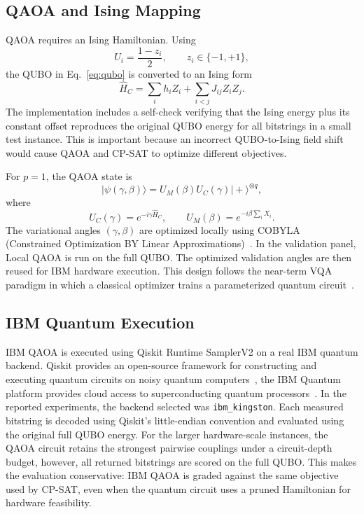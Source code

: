 \documentclass[runningheads]{llncs}
\begin{document}
\subsection{QAOA and Ising Mapping}

QAOA requires an Ising Hamiltonian. Using
\begin{equation}
U_i=\frac{1-z_i}{2},\qquad z_i\in\{-1,+1\},
\end{equation}
the QUBO in Eq.~\eqref{eq:qubo} is converted to an Ising form
\begin{equation}
\hat{H}_C=\sum_i h_iZ_i+\sum_{i<j}J_{ij}Z_iZ_j.
\end{equation}
The implementation includes a self-check verifying that the Ising energy plus its constant offset reproduces the original QUBO energy for all bitstrings in a small test instance. This is important because an incorrect QUBO-to-Ising field shift would cause QAOA and CP-SAT to optimize different objectives.

For $p=1$, the QAOA state is
\begin{equation}
|\psi(\gamma,\beta)\rangle =
U_M(\beta)U_C(\gamma)|+\rangle^{\otimes q},
\end{equation}
where
\begin{equation}
U_C(\gamma)=e^{-i\gamma \hat{H}_C}, \qquad
U_M(\beta)=e^{-i\beta\sum_i X_i}.
\end{equation}
The variational angles $(\gamma,\beta)$ are optimized locally using COBYLA (Constrained Optimization BY Linear Approximations)~\cite{powell1994direct}. In the validation panel, Local QAOA is run on the full QUBO. The optimized validation angles are then reused for IBM hardware execution. This design follows the near-term VQA paradigm in which a classical optimizer trains a parameterized quantum circuit~\cite{cerezo2021variational}.

\subsection{IBM Quantum Execution}

IBM QAOA is executed using Qiskit Runtime SamplerV2 on a real IBM quantum backend. Qiskit provides an open-source framework for constructing and executing quantum circuits on noisy quantum computers~\cite{javadiabhari2024qiskit}, the IBM Quantum platform provides cloud access to superconducting quantum processors~\cite{ibmquantum}. In the reported experiments, the backend selected was \texttt{ibm\_kingston}. Each measured bitstring is decoded using Qiskit's little-endian convention and evaluated using the original full QUBO energy. For the larger hardware-scale instances, the QAOA circuit retains the strongest pairwise couplings under a circuit-depth budget, however, all returned bitstrings are scored on the full QUBO. This makes the evaluation conservative: IBM QAOA is graded against the same objective used by CP-SAT, even when the quantum circuit uses a pruned Hamiltonian for hardware feasibility.
\end{document}

